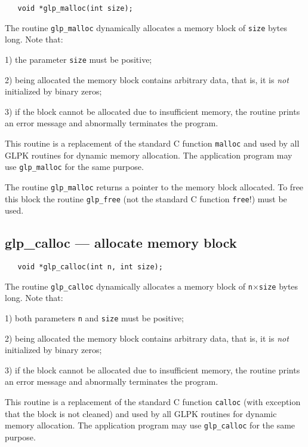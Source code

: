 \synopsis

\begin{verbatim}
   void *glp_malloc(int size);
\end{verbatim}

\description

The routine \verb|glp_malloc| dynamically allocates a memory block of
\verb|size| bytes long. Note that:

1) the parameter \verb|size| must be positive;

2) being allocated the memory block contains arbitrary data, that is,
it is {\it not} initialized by binary zeros;

3) if the block cannot be allocated due to insufficient memory, the
routine prints an error message and abnormally terminates the program.

This routine is a replacement of the standard C function \verb|malloc|
and used by all GLPK routines for dynamic memory allocation. The
application program may use \verb|glp_malloc| for the same purpose.

\returns

The routine \verb|glp_malloc| returns a pointer to the memory block
allocated. To free this block the routine \verb|glp_free| (not the
standard C function \verb|free|!) must be used.

\subsection{glp\_calloc --- allocate memory block}

\synopsis

\begin{verbatim}
   void *glp_calloc(int n, int size);
\end{verbatim}

\description

The routine \verb|glp_calloc| dynamically allocates a memory block of
\verb|n|$\times$\verb|size| bytes long. Note that:

1) both parameters \verb|n| and \verb|size| must be positive;

2) being allocated the memory block contains arbitrary data, that is,
it is {\it not} initialized by binary zeros;

3) if the block cannot be allocated due to insufficient memory, the
routine prints an error message and abnormally terminates the program.

This routine is a replacement of the standard C function \verb|calloc|
(with exception that the block is not cleaned) and used by all GLPK
routines for dynamic memory allocation. The application program may use
\verb|glp_calloc| for the same purpose.

